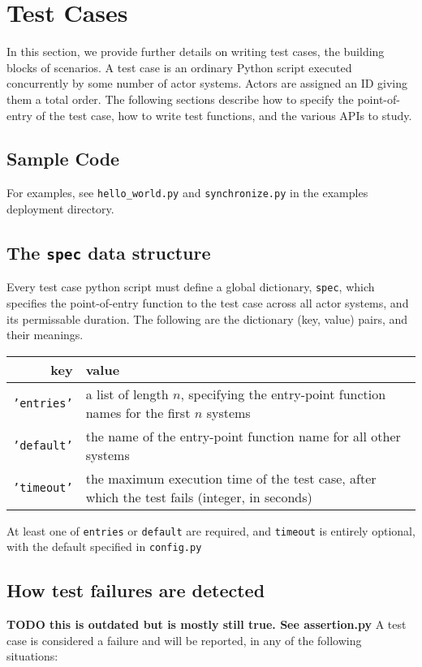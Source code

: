 \section{Test Cases}
In this section, we provide further details on writing test cases, the building
blocks of scenarios. A test case is an ordinary Python script executed
concurrently by some number of actor systems. Actors are assigned an ID giving
them a total order. The following sections describe how to specify the
point-of-entry of the test case, how to write test functions, and the various
APIs to study.

\subsection{Sample Code}
For examples, see {\tt hello\_world.py} and {\tt synchronize.py} in the
examples deployment directory.

\subsection{The {\tt spec} data structure}
Every test case python script must define a global dictionary, {\tt spec}, which
specifies the point-of-entry function to the test case across all actor systems,
and its permissable duration.  The following are the dictionary (key, value)
pairs, and their meanings.

\begin{center}
\begin{tabular}{ r | p{8cm} }
    key           & value \\
    \hline
    {\tt 'entries'} 
        & a list of length $n$, specifying the entry-point function names for
          the first $n$ systems \\
    {\tt 'default'}
        & the name of the entry-point function name for all other systems \\
    {\tt 'timeout'}
        & the maximum execution time of the test case, after which the test
          fails (integer, in seconds) \\
\end{tabular}
\end{center}

At least one of {\tt entries} or {\tt default} are required, and {\tt timeout}
is entirely optional, with the default specified in {\tt config.py}

\subsection{How test failures are detected}
{\bf TODO this is outdated but is mostly still true. See assertion.py}
A test case is considered a failure and will be reported, in any of the following situations:

